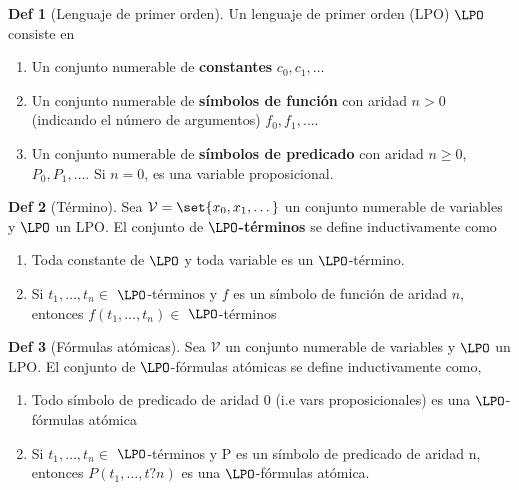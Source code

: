 \documentclass{report}
\theoremstyle{definition} %
\newtheorem*{definition*}{Def}
\begin{document}
\begin{definition*}[Lenguaje de primer orden]
    Un lenguaje de primer orden (LPO) $\LPO$ consiste en
    \begin{enumerate}
        \item Un conjunto numerable de \textbf{constantes} $c_0, c_1, \dots$
        \item Un conjunto numerable de \textbf{símbolos de función} con aridad
        $n > 0$ (indicando el número de argumentos) $f_0, f_1, \dots$.
        \item Un conjunto numerable de \textbf{símbolos de predicado} con aridad
        $n \geq 0$, $P_0, P_1, \dots$. Si $n = 0$, es una variable
        proposicional.
    \end{enumerate}
\end{definition*}

\begin{definition*}[Término]
    Sea $\mathcal{V} = \set{x_0, x_1, \dots}$ un conjunto numerable de variables
    y $\LPO$ un LPO. El conjunto de \textbf{$\LPO$-términos}
    se define inductivamente como

    \begin{enumerate}
        \item Toda constante de $\LPO$ y toda variable es un $\LPO$-término.
        \item Si $t_1, \dots, t_n \in$ $\LPO$-términos y $f$ es un símbolo de
        función de aridad $n$, entonces $f(t_1, \dots, t_n) \in$ $\LPO$-términos
    \end{enumerate}
\end{definition*}

\begin{definition*}[Fórmulas atómicas]
    Sea $\mathcal{V}$ un conjunto numerable de variables y $\LPO$ un LPO. El
    conjunto de $\LPO$-fórmulas atómicas se define inductivamente como,

    \begin{enumerate}
        \item Todo símbolo de predicado de aridad 0 (i.e vars proposicionales)
        es una $\LPO$-fórmulas atómica
        \item Si $t_1, \dots, t_n \in$ $\LPO$-términos y P es un símbolo de
        predicado de aridad n, entonces $P(t_1, \dots, t?n)$ es una
        $\LPO$-fórmulas atómica.
    \end{enumerate}
    
\end{definition*}
\end{document}

